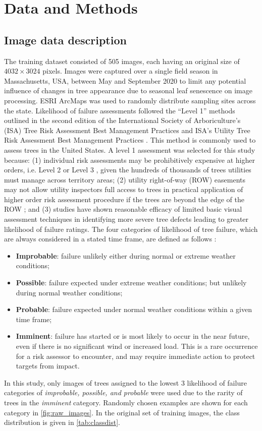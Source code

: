 \documentclass[Journal,letterpaper, SingleSpace, InsideFigs]{ascelike-new}
\begin{document}
\section{Data and Methods}
\subsection{Image data description}
The training dataset consisted of 505 images, each having an original size of $4032\times3024$ pixels.   Images were captured over a single field season in Massachusetts, USA, between May and September 2020 to limit any potential influence of changes in tree appearance due to seasonal leaf senescence on image processing.  ESRI ArcMaps was used to randomly distribute sampling sites across the state.  Likelihood of failure assessments followed the “Level 1” methods outlined in the second edition of the International Society of Arboriculture’s (ISA) Tree Risk Assessment Best Management Practices \cite{smiley2017best} and ISA’s Utility Tree Risk Assessment Best Management Practices \cite{goodfellow2020best}.  This method is commonly used to assess trees in the United States.  A level 1 assessment was selected for this study because: (1) individual risk assessments may be prohibitively expensive at higher orders, i.e. Level 2 or Level 3 \cite{smiley2017best}, given the hundreds of thousands of trees utilities must manage across territory areas;  (2) utility right-of-way (ROW) easements may not allow utility inspectors full access to trees in practical application of higher order risk assessment procedure if the trees are beyond the edge of the ROW \cite{goodfellow2020best}; and (3) studies have shown reasonable efficacy of limited basic visual assessment techniques in identifying more severe tree defects \cite{rooney2005reliability,koeser2016frequency} leading to greater likelihood of failure ratings.  The four categories of likelihood of tree failure, which are always considered in a stated time frame, are defined as follows \cite{smiley2017best}:
\begin{itemize}
\item \textbf{Improbable}: failure unlikely either during normal or extreme weather conditions;
\item \textbf{Possible}: failure expected under extreme weather conditions; but unlikely during normal weather conditions;
\item \textbf{Probable}: failure expected under normal weather conditions within a given time frame;
\item \textbf{Imminent}: failure has started or is most likely to occur in the near future, even if there is no significant wind or increased load. This is a rare occurrence for a risk assessor to encounter, and may require immediate action to protect targets from impact.
\end{itemize}
In this study, only images of trees assigned to the lowest 3 likelihood of failure categories of \textit{improbable, possible, \textit{and} probable} were used due to the rarity of trees in the \textit{imminent} category. Randomly chosen examples are shown for each category in \autoref{fig:raw_images}.   In the original set of training images, the class distribution is given in \autoref{tab:classdist}.
\end{document}
